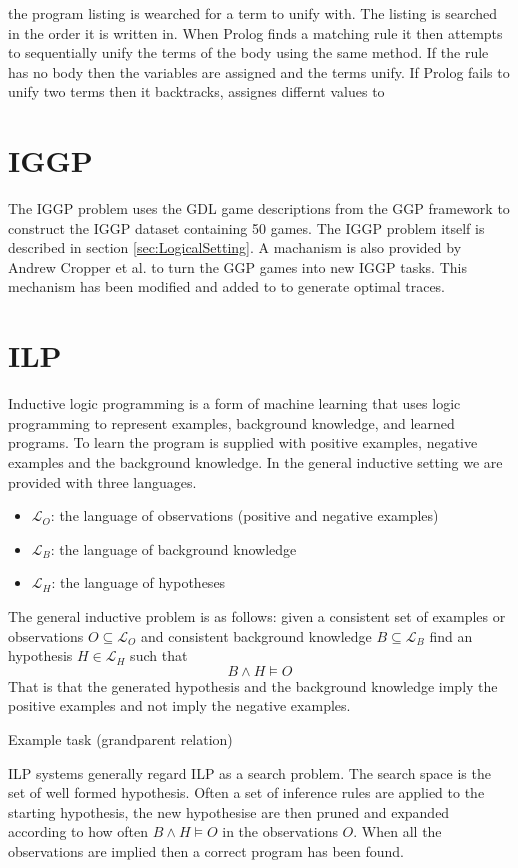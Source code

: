 the program listing is wearched for a term to unify with. The listing is searched in the order it is written in. When Prolog finds a matching rule it then attempts to sequentially unify the terms of the body using the same method. If the rule has no body then the variables are assigned and the terms unify. If Prolog fails to unify two terms then it backtracks, assignes differnt values to \cite{Bratko}


\section{IGGP}
The IGGP problem uses the GDL game descriptions from the GGP framework to construct the IGGP dataset containing 50 games. The IGGP problem itself is described in section \ref{sec:LogicalSetting}. A machanism is also provided by Andrew Cropper et al. \cite{Cropper/IGGP} to turn the GGP games into new IGGP tasks. This mechanism has been modified and added to to generate optimal traces.


\section{ILP}\label{sec:ILP}
Inductive logic programming is a form of machine learning that uses logic programming to represent examples, background knowledge, and learned programs\cite{Cropper/EfficientLearning}. To learn the program is supplied with positive examples, negative examples and the background knowledge. In the general inductive setting we are provided with three languages.
\begin{itemize}
\item $\mathcal{L}_O$: the language of observations (positive and negative examples)
\item $\mathcal{L}_B$: the language of background knowledge
\item $\mathcal{L}_H$: the language of hypotheses
\end{itemize}
The general inductive problem is as follows: given a consistent set of examples or observations $O \subseteq \mathcal{L}_O$ and consistent background knowledge $B \subseteq \mathcal{L}_B$ find an hypothesis $H \in \mathcal{L}_H$ such that \[B \wedge H \vDash O\] \cite{Muggleton/ILP}
That is that the generated hypothesis and the background knowledge imply the positive examples and not imply the negative examples.

Example task (grandparent relation)

ILP systems generally regard ILP as a search problem. The search space is the set of well formed hypothesis. Often a set of inference rules are applied to the starting hypothesis, the new hypothesise are then pruned and expanded according to how often $B \wedge H \vDash O$ in the observations $O$. When all the observations are implied then a correct program has been found.



